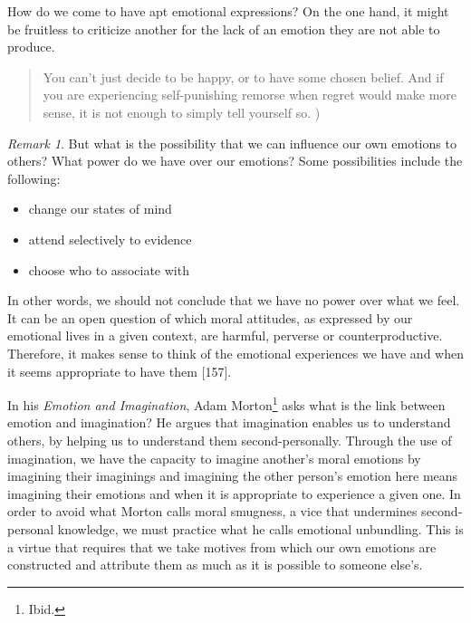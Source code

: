 \documentclass[phdthesis,12pt,final]{wuthesis}
\theoremstyle{definition}
\theoremstyle{definition}
\theoremstyle{definition}
\theoremstyle{definition}
\theoremstyle{remark}
\newtheorem*{remark}{Remark}
\begin{document}
How do we come to have apt emotional expressions? On the one hand, it might be fruitless to criticize another for the lack of an emotion they are not able to produce.

\begin{quote}
You can't just decide to be happy, or to have some chosen belief. And if you are experiencing self-punishing remorse when regret would make more sense, it is not enough to simply tell yourself so. )
\end{quote}

\begin{remark}

But what is the possibility that we can influence our own emotions to others? What power do we have over our emotions? Some possibilities include the following:

\begin{itemize}
\tightlist
\item
  change our states of mind
\item
  attend selectively to evidence
\item
  choose who to associate with
\end{itemize}

\end{remark}

In other words, we should not conclude that we have no power over what we feel. It can be an open question of which moral attitudes, as expressed by our emotional lives in a given context, are harmful, perverse or counterproductive. Therefore, it makes sense to think of the emotional experiences we have and when it seems appropriate to have them {[}157{]}.

In his \emph{Emotion and Imagination}, Adam Morton\footnote{Ibid.} asks what is the link between emotion and imagination? He argues that imagination enables us to understand others, by helping us to understand them second-personally. Through the use of imagination, we have the capacity to imagine another's moral emotions by imagining their imaginings and imagining the other person's emotion here means imagining their emotions and when it is appropriate to experience a given one. In order to avoid what Morton calls moral smugness, a vice that undermines second-personal knowledge, we must practice what he calls emotional unbundling. This is a virtue that requires that we take motives from which our own emotions are constructed and attribute them as much as it is possible to someone else's.
\end{document}
